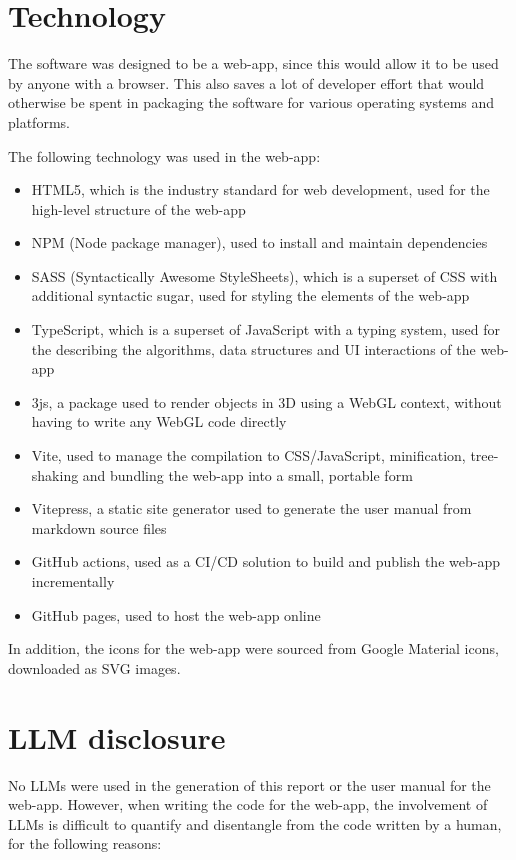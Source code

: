 \documentclass[letterpaper,11pt]{article}
\begin{document}
\section*{Technology}

The software was designed to be a web-app, since this would allow it to be used by anyone with a browser. This also saves a lot of developer effort that would otherwise be spent in packaging the software for various operating systems and platforms.

The following technology was used in the web-app:

\begin{itemize}
	\item HTML5, which is the industry standard for web development, used for the high-level structure of the web-app
	\item NPM (Node package manager), used to install and maintain dependencies
	\item SASS (Syntactically Awesome StyleSheets), which is a superset of CSS with additional syntactic sugar, used for styling the elements of the web-app
	\item TypeScript, which is a superset of JavaScript with a typing system, used for the describing the algorithms, data structures and UI interactions of the web-app
	\item 3js, a package used to render objects in 3D using a WebGL context, without having to write any WebGL code directly
	\item Vite, used to manage the compilation to CSS/JavaScript, minification, tree-shaking and bundling the web-app into a small, portable form
	\item Vitepress, a static site generator used to generate the user manual from markdown source files
	\item GitHub actions, used as a CI/CD solution to build and publish the web-app incrementally
	\item GitHub pages, used to host the web-app online
\end{itemize}

In addition, the icons for the web-app were sourced from Google Material icons, downloaded as SVG images.


\section*{LLM disclosure}

No LLMs were used in the generation of this report or the user manual for the web-app. However, when writing the code for the web-app, the involvement of LLMs is difficult to quantify and disentangle from the code written by a human, for the following reasons:
\end{document}
